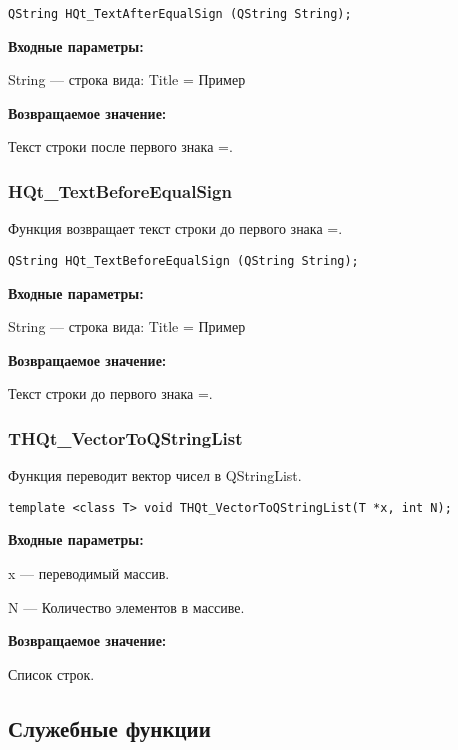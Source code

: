 \documentclass[a4paper,12pt]{article}
\begin{document}
\begin{lstlisting}[label=code_syntax_HQt_TextAfterEqualSign,caption=Синтаксис]
QString HQt_TextAfterEqualSign (QString String);
\end{lstlisting}

\textbf{Входные параметры:}
 
String --- строка вида: Title = Пример

\textbf{Возвращаемое значение:}

Текст строки после первого знака =.


\subsubsection{HQt\_TextBeforeEqualSign}\label{HQt_TextBeforeEqualSign}

Функция возвращает текст строки до первого знака =.


\begin{lstlisting}[label=code_syntax_HQt_TextBeforeEqualSign,caption=Синтаксис]
QString HQt_TextBeforeEqualSign (QString String);
\end{lstlisting}

\textbf{Входные параметры:}
 
String --- строка вида: Title = Пример

\textbf{Возвращаемое значение:}

Текст строки до первого знака =.


\subsubsection{THQt\_VectorToQStringList}\label{THQt_VectorToQStringList}

Функция переводит вектор чисел в QStringList.


\begin{lstlisting}[label=code_syntax_THQt_VectorToQStringList,caption=Синтаксис]
template <class T> void THQt_VectorToQStringList(T *x, int N);
\end{lstlisting}

\textbf{Входные параметры:}

x --- переводимый массив.

     N --- Количество элементов в массиве.

\textbf{Возвращаемое значение:}
 
Список строк.


\subsection{Служебные функции}
\end{document}
